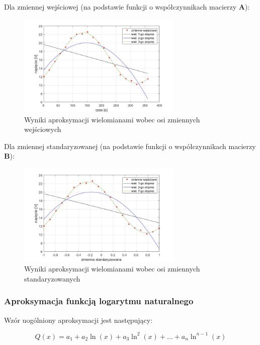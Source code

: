 \documentclass[a4paper, 12pt]{mwart}
\begin{document}
					Dla zmiennej wejściowej (na podstawie funkcji o współczynnikach macierzy $\textbf{A}$):
					\begin{figure}[h]
						\begin{center}
							\includegraphics[width = 0.7\textwidth]{graphs/3-n.jpg}
							\caption{Wyniki aproksymacji wielomianami wobec osi zmiennych wejściowych}
							\label{fig:3N}
						\end{center}
					\end{figure}

					Dla zmiennej standaryzowanej (na podstawie funkcji o współczynnikach macierzy $\textbf{B}$):
					\begin{figure}[h]
						\begin{center}
							\includegraphics[width = 0.7\textwidth]{graphs/3-s.jpg}
							\caption{Wyniki aproksymacji wielomianami wobec osi zmiennych standaryzowanych}
							\label{fig:3S}
						\end{center}
					\end{figure}

			\newpage
			\subsubsection{Aproksymacja funkcją logarytmu naturalnego}
				Wzór uogólniony aproksymacji jest następujący:

				$$ Q(x) = a_1 + a_2 \ln\left(x\right) + a_3\ln^2\left(x\right) + \dots + a_n \ln^{n-1} \left(x\right)$$
\end{document}
